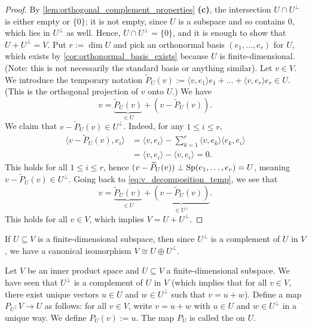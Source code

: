 \begin{proof}
By \cref{lem:orthogonal_complement_properties} \textbf{(c)}, the intersection $U \cap U^\perp$ is either empty or $\{0\}$; it is not empty, since $U$ is a subspace and so contains $0$, which lies in $U^\perp$ as well. Hence, $U \cap U^\perp = \{0\}$, and it is enough to show that $U + U^\perp = V$.
Put $r := \dim U$ and pick an orthonormal basis $(e_1, \dots, e_r)$ for $U$, which exists by \cref{cor:orthonormal_basis_exists} because $U$ is finite-di\-men\-sional. (Note: this is not necessarily the standard basis or anything similar). Let $v \in V$.
We introduce the temporary notation $\widetilde{P}_U(v) := \langle v, e_1 \rangle e_1 + \dots + \langle v, e_r \rangle e_r \in U$. (This is the orthogonal projection of $v$ onto $U$.)
We have
\begin{equation}
\label{eq:v_decomposition_temp}
    v = \underbrace{\widetilde{P}_U(v)}_{\in U} + (v - \widetilde{P}_U(v)).
\end{equation}
We claim that $v - \widetilde{P}_U(v) \in U^\perp$. Indeed, for any $1 \leq i \leq r$,
\begin{align*}
    \langle v - \widetilde{P}_U(v), e_i \rangle &= \langle v, e_i \rangle - \sum_{k=1}^r \langle v, e_k \rangle \langle e_k, e_i \rangle \\
    &= \langle v, e_i \rangle - \langle v, e_i \rangle = 0.
\end{align*}
This holds for all $1 \leq i \leq r$, hence $(v - \widetilde{P}_U(v)) \perp \operatorname{Sp}(e_1, \dots, e_r) = U$, meaning $v - \widetilde{P}_U(v) \in U^\perp$.
Going back to \eqref{eq:v_decomposition_temp}, we see that
\[
    v = \underbrace{\widetilde{P}_U(v)}_{\in U} + \underbrace{(v - \widetilde{P}_U(v))}_{\in U^\perp}.
\]
This holds for all $v \in V$, which implies $V = U + U^\perp$.
\end{proof}

\begin{remark}
If $U \subseteq V$ is a finite-di\-men\-sional subspace, then since $U^\perp$ is a complement of $U$ in $V$, we have a canonical isomorphism $V \cong U \oplus U^\perp$.
\end{remark}

\begin{definition}
\label{def:orthogonal_projection}
Let $V$ be an inner product space and $U \subseteq V$ a finite-di\-men\-sional subspace. We have seen that $U^\perp$ is a complement of $U$ in $V$ (which implies that for all $v \in V$, there exist unique vectors $u \in U$ and $w \in U^\perp$ such that $v = u + w$).
Define a map $P_U \colon V \to U$ as follows: for all $v \in V$, write $v = u + w$ with $u \in U$ and $w \in U^\perp$ in a unique way. We define $P_U(v) := u$. The map $P_U$ is called the  on $U$.
\end{definition}

